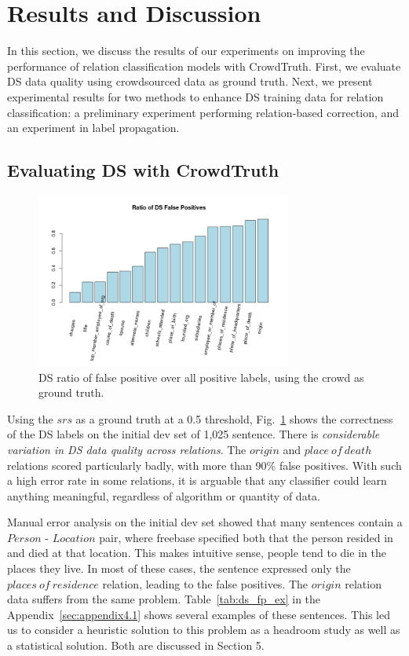 \section{Results and Discussion}

In this section, we discuss the results of our experiments on improving the performance of relation classification models with CrowdTruth. First, we evaluate DS data quality using crowdsourced data as ground truth. Next, we present experimental results for two methods to enhance DS training data for relation classification: a preliminary experiment performing relation-based correction, and an experiment in label propagation.


\subsection{Evaluating DS with CrowdTruth}
\label{sec:ds-eval}

\begin{figure}[htb!]
\centering
\includegraphics[width=0.75\textwidth]{img/fp_ratio.png}
\caption{DS ratio of false positive over all positive labels, using the crowd as ground truth.}
\label{fig:fp_rate}
\end{figure}

Using the $srs$ as a ground truth at a 0.5 threshold, Fig.~\ref{fig:fp_rate} shows the correctness of the DS labels on the initial dev set of 1,025 sentence. There is \textit{considerable variation in DS data quality across relations}. The $origin$ and $place\ of\ death$ relations scored particularly badly, with more than 90\% false positives. With such a high error rate in some relations, it is arguable that any classifier could learn anything meaningful, regardless of algorithm or quantity of data.

Manual error analysis on the initial dev set showed that many sentences contain a $Person$ - $Location$ pair, where freebase specified both that the person resided in and died at that location. This makes intuitive sense, people tend to die in the places they live.  In most of these cases, the sentence expressed only the $places\ of\ residence$ relation, leading to the false positives. The $origin$ relation data suffers from the same problem.  Table~\ref{tab:ds_fp_ex} in the Appendix~\ref{sec:appendix4.1} shows several examples of these sentences. This led us to consider a heuristic solution to this problem as a headroom study as well as a statistical solution. Both are discussed in Section 5.

